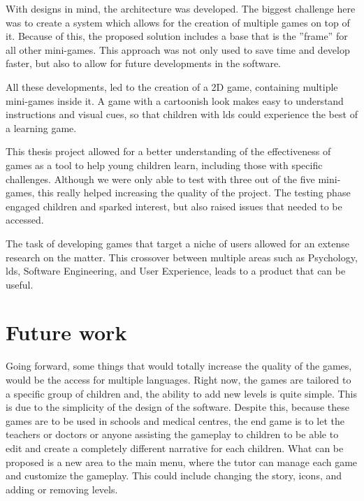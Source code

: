 With designs in mind, the architecture was developed. The biggest challenge here was to create a system which allows for the creation of multiple games on top of it. Because of this, the proposed solution includes a base that is the ''frame'' for all other mini-games. This approach was not only used to save time and develop faster, but also to allow for future developments in the software. 


All these developments, led to the creation of a 2D game, containing multiple mini-games inside it. A game with a cartoonish look makes easy to understand instructions and visual cues, so that children with \gls{ld}s could experience the best of a learning game.

This thesis project allowed for a better understanding of the effectiveness of games as a tool to help young children learn, including those with specific challenges. Although we were only able to test with three out of the five mini-games, this really helped increasing the quality of the project. The testing phase engaged children and sparked interest, but also raised issues that needed to be accessed.

The task of developing games that target a niche of users allowed for an extense research on the matter. This crossover between multiple areas such as Psychology, \gls{ld}s, Software Engineering, and User Experience, leads to a product that can be useful. 

\section{Future work}
\label{futureWork}

Going forward, some things that would totally increase the quality of the games, would be the access for multiple languages. Right now, the games are tailored to a specific group of children and, the ability to add new levels is quite simple. This is due to the simplicity of the design of the software. Despite this, because these games are to be used in schools and medical centres, the end game is to let the teachers or doctors or anyone assisting the gameplay to children to be able to edit and create a completely different narrative for each children. What can be proposed is a new area to the main menu, where the tutor can manage each game and customize the gameplay. This could include changing the story, icons, and adding or removing levels.

